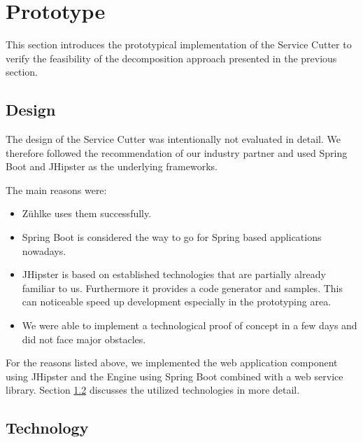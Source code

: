 \section{Prototype} 

This section introduces the prototypical implementation of the Service Cutter to verify the feasibility of the decomposition approach presented in the previous section.

\subsection{Design}

The design of the Service Cutter was intentionally not evaluated in detail. We therefore followed the recommendation of our industry partner and used Spring Boot\cite{springboot} and JHipster\cite{jhipster} as the underlying frameworks.

The main reasons were:

\begin{itemize}
\item Zühlke uses them successfully.
\item Spring Boot is considered the way to go for Spring based applications nowadays.
\item JHipster is based on established technologies that are partially already familiar to us. Furthermore it provides a code generator and samples. This can noticeable speed up development especially in the prototyping area.
\item We were able to implement a technological proof of concept in a few days and did not face major obstacles.
\end{itemize}

For the reasons listed above, we implemented the web application component using JHipster and the Engine using Spring Boot combined with a web service library. Section \ref{subsec:technology} discusses the utilized technologies in more detail.

\subsection{Technology}
\label{subsec:technology}


